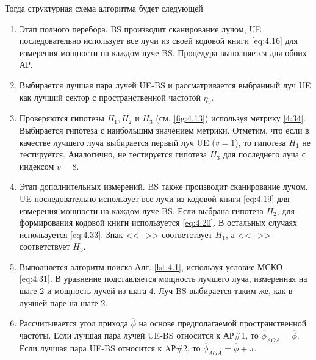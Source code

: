 Тогда структурная схема алгоритма будет следующей
\begin{enumerate}[label=\textbf{Шаг \arabic*:}]
    \item Этап полного перебора. BS производит сканирование лучом, UE
          последовательно использует все лучи из своей кодовой книги \eqref{eq:4.16} для
          измерения мощности на каждом луче BS. Процедура выполняется для обоих АР.
    \item Выбирается лучшая пара лучей UE-BS и рассматривается выбранный луч UE
          как лучший сектор с пространственной частотой $\eta_v$.
    \item Проверяются гипотезы $H_1, H_2$ и $H_3$ (см. \ref{fig:4.13}) используя метрику \eqref{4:34}.
          Выбирается гипотеза с наибольшим значением метрики. Отметим, что если в
          качестве лучшего луча выбирается первый луч UE ($v=1$), то гипотеза
          $H_1$ не тестируется.
          Аналогично, не тестируется гипотеза $H_3$ для последнего луча с
          индексом $v=8$.  \item  Этап дополнительных измерений. BS также
          производит сканирование лучом.  UE последовательно использует все лучи
          из кодовой книги \eqref{eq:4.19} для измерения мощности на каждом луче
          BS. Если выбрана гипотеза $H_2$, для формирования кодовой книги
          используется \eqref{eq:4.20}.  В остальных случаях используется
          \eqref{eq:4.33}. Знак <<$-$>> соответствует $H_1$, а <<$+$>>
          соответствует  $H_3$.
    \item Выполняется алгоритм поиска Алг. \ref{lst:4.1}, используя условие МСКО
          \eqref{eq:4.31}. В уравнение подставляется мощность лучшего луча, измеренная
          на шаге 2 и мощность лучей из шага 4. Луч BS выбирается таким же, как в
          лучшей паре на шаге 2.
    \item Рассчитывается угол прихода $\hat \phi$ на основе предполагаемой
          пространственной частоты. Если лучшая пара лучей UE-BS относится к АР\#1, то
          $\hat \phi_{AOA} = \hat \phi$. Если лучшая пара UE-BS относится к AР\#2, то
          $\hat \phi_{AOA} = \hat \phi + \pi$.
\end{enumerate}


